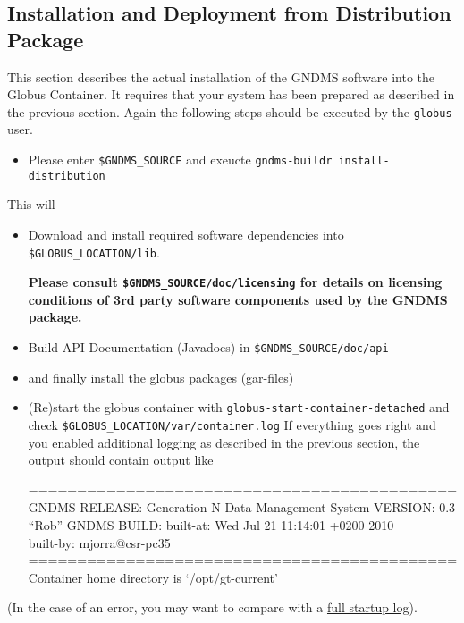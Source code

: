 \documentclass{article}
\begin{document}
\subsection{Installation and Deployment from Distribution Package}

This section describes the actual installation of the GNDMS
software into the Globus Container. It requires that your system
has been prepared as described in the previous section. Again the
following steps should be executed by the \verb!globus! user.

\begin{itemize}
\item
  Please enter \verb!$GNDMS_SOURCE! and exeucte
  \verb!gndms-buildr install-distribution!
\end{itemize}
This will

\begin{itemize}
\item
  Download and install required software dependencies into
  \verb!$GLOBUS_LOCATION/lib!.

  \textbf{Please consult \texttt{\$GNDMS\_SOURCE/doc/licensing} for details on licensing conditions of 3rd party software components used by the GNDMS package.}

\item
  Build API Documentation (Javadocs) in \verb!$GNDMS_SOURCE/doc/api!
\item
  and finally install the globus packages (gar-files)

\item
  (Re)start the globus container with
  \verb!globus-start-container-detached! and check
  \verb!$GLOBUS_LOCATION/var/container.log! If everything goes right
  and you enabled additional logging as described in the previous
  section, the output should contain output like

  {\small ============================================\\
  GNDMS RELEASE: Generation N Data Management System VERSION: 0.3\\
  ``Rob'' GNDMS BUILD: built-at: Wed Jul 21 11:14:01 +0200 2010\\
  built-by: mjorra@csr-pc35\\
  ============================================\\
  Container home directory is `/opt/gt-current'}

\end{itemize}
(In the case of an error, you may want to compare with a
\href{startup-log.txt}{full startup log}).
\end{document}
